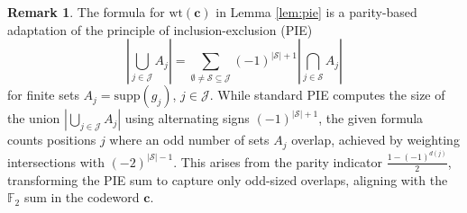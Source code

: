 \documentclass[conference]{IEEEtran}
\theoremstyle{definition}
\newtheorem{remark}{Remark}
\renewcommand{\S}{\mathcal{S}}
\newcommand{\J}{\mathcal{J}}
\begin{document}
\begin{remark}
    The formula for $\mathrm{wt}(\mathbf{c})$ in Lemma \ref{lem:pie} is a parity-based adaptation of the principle of inclusion-exclusion (PIE) 
    \[
    \left|\bigcup_{j\in\J} A_j\right|=\sum_{\emptyset \neq \S \subseteq\J}(-1)^{|\S|+1}\left|\bigcap_{j \in \S} A_j\right|
    \]
    for finite sets $A_j = \mathrm{supp}(g_j)$, $j \in \mathcal{J}$. While standard PIE computes the size of the union $\left| \bigcup_{j \in \mathcal{J}} A_j \right|$ using alternating signs $(-1)^{|\mathcal{S}|+1}$, the given formula counts positions $j$ where an odd number of sets $A_j$ overlap, achieved by weighting intersections with $(-2)^{|\mathcal{S}|-1}$. This arises from the parity indicator $\frac{1 - (-1)^{d(j)}}{2}$, transforming the PIE sum to capture only odd-sized overlaps, aligning with the $\mathbb{F}_2$ sum in the codeword $\mathbf{c}$.
\end{remark}



\end{document}
